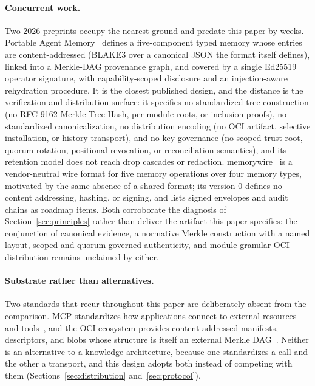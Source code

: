 \documentclass[11pt,a4paper]{article}
\begin{document}
\paragraph{Concurrent work.}
Two 2026 preprints occupy the nearest ground and predate this paper by weeks.
Portable Agent Memory~\cite{ravindran2026pam} defines a five-component typed
memory whose entries are content-addressed (BLAKE3 over a canonical JSON the
format itself defines), linked into a Merkle-DAG provenance graph, and covered
by a single Ed25519 operator signature, with capability-scoped disclosure and
an injection-aware rehydration procedure. It is the closest published design,
and the distance is the verification and distribution surface: it specifies no
standardized tree construction (no RFC 9162 Merkle Tree Hash, per-module
roots, or inclusion proofs), no standardized canonicalization, no distribution
encoding (no OCI artifact, selective installation, or history transport), and
no key governance (no scoped trust root, quorum rotation, positional
revocation, or reconciliation semantics), and its retention model does not
reach drop cascades or redaction. memorywire~\cite{munirathinam2026memorywire}
is a vendor-neutral wire format for five memory operations over four memory
types, motivated by the same absence of a shared format; its version 0 defines
no content addressing, hashing, or signing, and lists signed envelopes and
audit chains as roadmap items. Both corroborate the diagnosis of
Section~\ref{sec:principles} rather than deliver the artifact this paper
specifies: the conjunction of canonical evidence, a normative Merkle
construction with a named layout, scoped and quorum-governed authenticity, and
module-granular OCI distribution remains unclaimed by either.

\paragraph{Substrate rather than alternatives.}
Two standards that recur throughout this paper are deliberately absent from the
comparison. MCP standardizes how applications connect to external resources and
tools~\cite{mcp2024}, and the OCI ecosystem provides content-addressed
manifests, descriptors, and blobs whose structure is itself an external Merkle
DAG~\cite{oci_image_manifest, oci_descriptor, oras_artifacts}. Neither is an
alternative to a knowledge architecture, because one standardizes a call and the
other a transport, and this design adopts both instead of competing with them
(Sections~\ref{sec:distribution} and~\ref{sec:protocol}).
\end{document}
